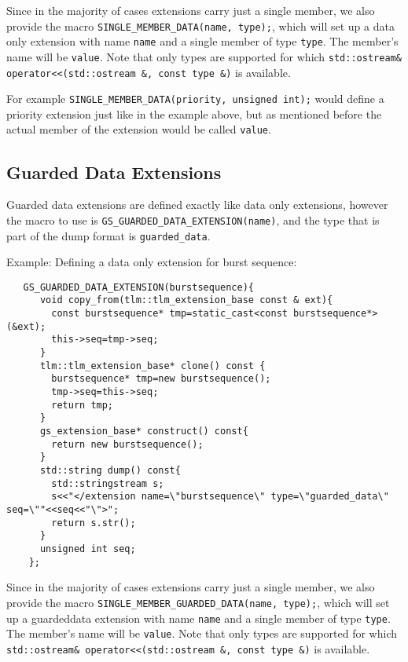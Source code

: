 \documentclass[a4paper,10pt]{article}          %
\begin{document}
Since in the majority of cases extensions carry just a single member, we also provide the macro \linebreak\verb|SINGLE_MEMBER_DATA(name, type);|, which will set up a data only extension with name \verb|name| and a single member of type \verb|type|. The member's name will be \verb|value|. Note that only types are supported for which \linebreak\verb|std::ostream& operator<<(std::ostream &, const type &)| is available.

For example \verb|SINGLE_MEMBER_DATA(priority, unsigned int);| would define a priority extension just like in the example above, but as mentioned before the actual member of the extension would be called \verb|value|.

\subsection{Guarded Data Extensions}
Guarded data extensions are defined exactly like data only extensions, however the macro to use is \linebreak\verb|GS_GUARDED_DATA_EXTENSION(name)|, and the type that is part of the dump format is \verb|guarded_data|.

Example: Defining a data only extension for burst sequence:
\begin{small}
\begin{verbatim}
   GS_GUARDED_DATA_EXTENSION(burstsequence){
      void copy_from(tlm::tlm_extension_base const & ext){
        const burstsequence* tmp=static_cast<const burstsequence*>(&ext);
        this->seq=tmp->seq;
      }
      tlm::tlm_extension_base* clone() const {
        burstsequence* tmp=new burstsequence(); 
        tmp->seq=this->seq; 
        return tmp;
      }
      gs_extension_base* construct() const{
        return new burstsequence();
      }
      std::string dump() const{
        std::stringstream s;
        s<<"</extension name=\"burstsequence\" type=\"guarded_data\" seq=\""<<seq<<"\">";
        return s.str();
      }
      unsigned int seq;
    };
\end{verbatim}
\end{small}

Since in the majority of cases extensions carry just a single member, we also provide the macro \linebreak\verb|SINGLE_MEMBER_GUARDED_DATA(name, type);|, which will set up a guardeddata extension with name \verb|name| and a single member of type \verb|type|. The member's name will be \verb|value|. Note that only types are supported for which \linebreak\verb|std::ostream& operator<<(std::ostream &, const type &)| is available.
\end{document}
